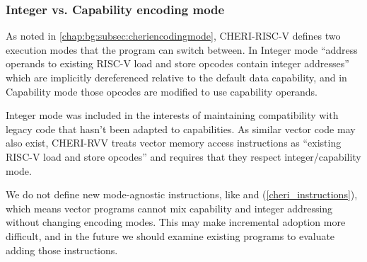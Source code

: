 \subsubsection{Integer vs. Capability encoding mode\label{chap:emu:rvv_int_mode}}
As noted in \cref{chap:bg:subsec:cheriencodingmode}, CHERI-RISC-V defines two execution modes that the program can switch between.
In Integer mode \enquote{address operands to existing RISC-V load and store opcodes contain integer addresses} which are implicitly dereferenced relative to the default data capability, and in Capability mode those opcodes are modified to use capability operands.

Integer mode was included in the interests of maintaining compatibility with legacy code that hasn't been adapted to capabilities.
As similar vector code may also exist, CHERI-RVV treats vector memory access instructions as \enquote{existing RISC-V load and store opcodes} and requires that they respect integer/capability mode.

We do not define new mode-agnostic instructions, like  and  (\cref{cheri_instructions}), which means vector programs cannot mix capability and integer addressing without changing encoding modes.
This may make incremental adoption more difficult, and in the future we should examine existing programs to evaluate adding those instructions.
